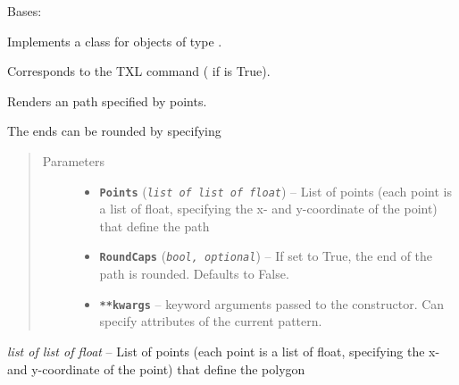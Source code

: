 \documentclass[letterpaper,10pt,english]{sphinxmanual}
\begin{document}
\begin{fulllineitems}
\label{Chapters/PythonModuleReference/Patterns/TXLWizard.Patterns.Polyline:TXLWizard.Patterns.Polyline.Polyline}
Bases: {\hyperref[Chapters/PythonModuleReference/Patterns/TXLWizard.Patterns.AbstractPattern:TXLWizard.Patterns.AbstractPattern.AbstractPattern]{}}

Implements a class for  objects of type .

Corresponds to the TXL command  ( if  is True).

Renders an path specified by points.

The ends can be rounded by specifying 
\begin{quote}\begin{description}
\item[{Parameters}] \leavevmode\begin{itemize}
\item {} 
\textbf{\texttt{Points}} (\emph{\texttt{list of list of float}}) -- List of points (each point is a list of float, specifying the x- and y-coordinate of the point) that define the path

\item {} 
\textbf{\texttt{RoundCaps}} (\emph{\texttt{bool, optional}}) -- If set to True, the end of the path is rounded.
Defaults to False.

\item {} 
\textbf{\texttt{**kwargs}} -- keyword arguments passed to the {\hyperref[Chapters/PythonModuleReference/Patterns/TXLWizard.Patterns.AbstractPattern:TXLWizard.Patterns.AbstractPattern.AbstractPattern]{}} constructor.
Can specify attributes of the current pattern.

\end{itemize}

\end{description}\end{quote}

\begin{fulllineitems}
\label{Chapters/PythonModuleReference/Patterns/TXLWizard.Patterns.Polyline:TXLWizard.Patterns.Polyline.Polyline.Points}
\emph{list of list of float} -- List of points (each point is a list of float, specifying the x- and y-coordinate of the point) that define the polygon


\end{fulllineitems}
\end{fulllineitems}
\end{document}
